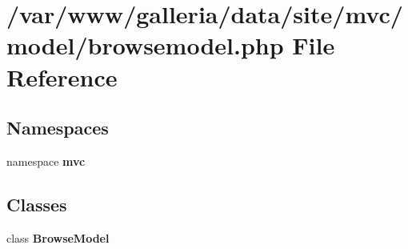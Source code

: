 \section{/var/www/galleria/data/site/mvc/model/browsemodel.php File Reference}
\label{browsemodel_8php}
\subsection*{Namespaces}
\begin{CompactItemize}
\item 
namespace {\bf mvc}
\end{CompactItemize}
\subsection*{Classes}
\begin{CompactItemize}
\item 
class {\bf BrowseModel}
\end{CompactItemize}
